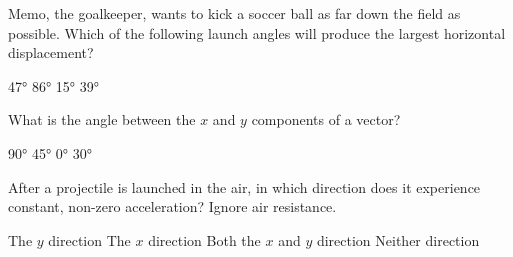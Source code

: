 \documentclass[dvipsnames]{exam}
\begin{document}
\begin{questions}

\question
Memo, the goalkeeper, wants to kick a soccer ball as far down the field as possible. Which of the following launch angles will produce the largest horizontal displacement?

\begin{minipage}{6cm}
\centering
    \begin{randomizechoices}
        \correctchoice \ang{47}
        \choice \ang{86}
        \choice \ang{15}
        \choice \ang{39}
    \end{randomizechoices}
\end{minipage}%
\begin{minipage}{6cm}
    \begin{center}
        \label{i1Y7vV}
    \end{center}
\end{minipage}

\question
What is the angle between the $x$ and $y$ components of a vector?

\begin{randomizechoices}
    \correctchoice \ang{90}
    \choice \ang{45}
    \choice \ang{0}
    \choice \ang{30}
\end{randomizechoices}

\question
After a projectile is launched in the air, in which direction does it experience constant, non-zero acceleration? Ignore air resistance.

\begin{randomizechoices}[keeplast]
    \correctchoice The $y$ direction
    \choice The $x$ direction
    \choice Both the $x$ and $y$ direction
    \choice Neither direction
\end{randomizechoices}


\end{questions}
\end{document}
